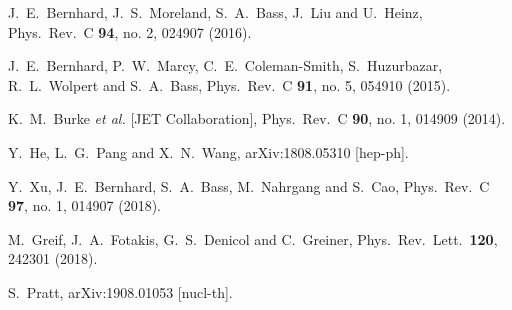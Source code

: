 \begin{thebibliography}{99}
  J.~E.~Bernhard, J.~S.~Moreland, S.~A.~Bass, J.~Liu and U.~Heinz,
  Phys.\ Rev.\ C {\bf 94}, no. 2, 024907 (2016).
  
  J.~E.~Bernhard, P.~W.~Marcy, C.~E.~Coleman-Smith, S.~Huzurbazar, R.~L.~Wolpert and S.~A.~Bass,
  Phys.\ Rev.\ C {\bf 91}, no. 5, 054910 (2015).

  K.~M.~Burke {\it et al.} [JET Collaboration],
  Phys.\ Rev.\ C {\bf 90}, no. 1, 014909 (2014).

  Y.~He, L.~G.~Pang and X.~N.~Wang,
  arXiv:1808.05310 [hep-ph].

  Y.~Xu, J.~E.~Bernhard, S.~A.~Bass, M.~Nahrgang and S.~Cao,
  Phys.\ Rev.\ C {\bf 97}, no. 1, 014907 (2018).
  
  M.~Greif, J.~A.~Fotakis, G.~S.~Denicol and C.~Greiner,
  Phys.\ Rev.\ Lett.\  {\bf 120}, 242301 (2018).

  S.~Pratt,
  arXiv:1908.01053 [nucl-th].


\end{thebibliography}
